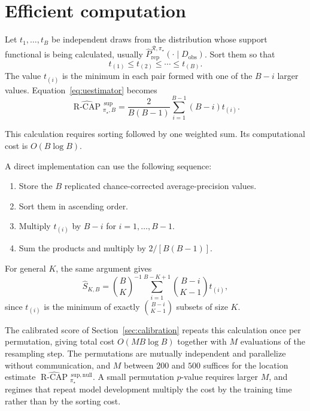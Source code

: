 \documentclass[11pt]{article}
\newcommand{\Regime}{\mathcal{R}}
\newcommand{\RCAPHatB}{\widehat{\operatorname{R\text{-}CAP}}{}^{\,\mathrm{sup}}_{\pi_\star,B}}
\newcommand{\RCAPnullHat}{\widehat{\operatorname{R\text{-}CAP}}{}^{\,\mathrm{sup,null}}_{\pi_\star}}
\newcommand{\PRepHat}{\widehat{P}_{\mathrm{rep}}^{\Regime,\pi_\star}}
\theoremstyle{remark}
\begin{document}
\section{Efficient computation}
\label{app:computation}

Let $t_1,\ldots,t_B$ be independent draws from the distribution whose support functional is being calculated, usually $\PRepHat(\cdot\mid D_{\mathrm{obs}})$. Sort them so that
\[
t_{(1)}\leq t_{(2)}\leq\cdots\leq t_{(B)}.
\]
The value $t_{(i)}$ is the minimum in each pair formed with one of the $B-i$ larger values. Equation~\eqref{eq:uestimator} becomes
\begin{equation}
\RCAPHatB
=
\frac{2}{B(B-1)}
\sum_{i=1}^{B-1}(B-i)t_{(i)}.
\label{eq:sorted}
\end{equation}

This calculation requires sorting followed by one weighted sum. Its computational cost is $O(B\log B)$.

A direct implementation can use the following sequence:

\begin{enumerate}
\item Store the $B$ replicated chance-corrected average-precision values.
\item Sort them in ascending order.
\item Multiply $t_{(i)}$ by $B-i$ for $i=1,\ldots,B-1$.
\item Sum the products and multiply by $2/[B(B-1)]$.
\end{enumerate}

For general $K$, the same argument gives
\[
\widehat S_{K,B}
=
\binom{B}{K}^{-1}
\sum_{i=1}^{B-K+1}
\binom{B-i}{K-1}
t_{(i)},
\]
since $t_{(i)}$ is the minimum of exactly $\binom{B-i}{K-1}$ subsets of size $K$.

The calibrated score of Section~\ref{sec:calibration} repeats this calculation once per permutation, giving total cost $O(MB\log B)$ together with $M$ evaluations of the resampling step. The permutations are mutually independent and parallelize without communication, and $M$ between $200$ and $500$ suffices for the location estimate $\RCAPnullHat$. A small permutation $p$-value requires larger $M$, and regimes that repeat model development multiply the cost by the training time rather than by the sorting cost.
\end{document}
